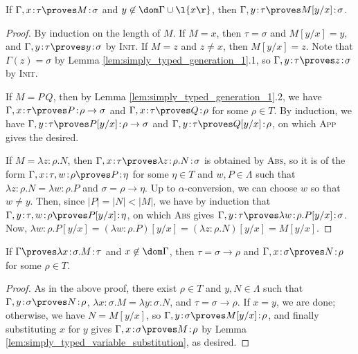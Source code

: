 \documentclass[reqno]{amsart}
\begin{document}
    \begin{lemma}\label{lem:simply_typed_variable_substitution}
        If $\Gamma,x\!:\!\tau\proves M\!:\!\sigma$ and $y\not\in\dom\Gamma\cup\l\{x\r\}$, then $\Gamma,y\!:\!\tau\proves M[y/x]\!:\!\sigma$.
    \end{lemma}
    \begin{proof}
        By induction on the length of $M$. If $M=x$, then $\tau=\sigma$ and $M[y/x]=y$, and $\Gamma,y\!:\!\tau\proves y\!:\!\sigma$ by \textsc{Init}. If $M=z$ and $z\neq x$, then $M[y/x]=z$. Note that $\Gamma(z)=\sigma$ by Lemma \ref{lem:simply_typed_generation_1}.1, so $\Gamma,y\!:\!\tau\proves z\!:\!\sigma$ by \textsc{Init}.

        If $M=P\,Q$, then by Lemma \ref{lem:simply_typed_generation_1}.2, we have $\Gamma,x\!:\!\tau\proves P\!:\!\rho\rightarrow\sigma$ and $\Gamma,x\!:\!\tau\proves Q\!:\!\rho$ for some $\rho\in T$. By induction, we have $\Gamma,y\!:\!\tau\proves P[y/x]\!:\!\rho\rightarrow\sigma$ and $\Gamma,y\!:\!\tau\proves Q[y/x]\!:\!\rho$, on which \textsc{App} gives the desired.

        If $M=\lambda z\!:\!\rho.N$, then $\Gamma,x\!:\!\tau\proves\lambda z\!:\!\rho.N\!:\!\sigma$ is obtained by \textsc{Abs}, so it is of the form $\Gamma,x\!:\!\tau,w\!:\!\rho\proves P\!:\!\eta$ for some $\eta\in T$ and $w,P\in\Lambda$ such that $\lambda z\!:\!\rho.N=\lambda w\!:\!\rho.P$ and $\sigma=\rho\to\eta$. Up to $\alpha$-conversion, we can choose $w$ so that $w\neq y$. Then, since $|P|=|N|<|M|$, we have by induction that $\Gamma,y\!:\!\tau,w\!:\!\rho\proves P[y/x]\!:\!\eta$, on which \textsc{Abs} gives $\Gamma,y\!:\!\tau\proves\lambda w\!:\!\rho.P[y/x]\!:\!\sigma$. Now, $\lambda w\!:\!\rho.P[y/x]=(\lambda w\!:\!\rho.P)[y/x]=(\lambda z\!:\!\rho.N)[y/x]=M[y/x]$.
    \end{proof}

    \begin{lemma}\label{lem:simply_typed_generation_2}
        If $\Gamma\proves\lambda x\!:\!\sigma.M\!:\!\tau$ and $x\not\in\dom\Gamma$, then $\tau=\sigma\rightarrow\rho$ and $\Gamma,x\!:\!\sigma\proves N\!:\!\rho$ for some $\rho\in T$.
    \end{lemma}
    \begin{proof}
        As in the above proof, there exist $\rho\in T$ and $y,N\in\Lambda$ such that $\Gamma,y\!:\!\sigma\proves N\!:\!\rho$, $\lambda x\!:\!\sigma.M=\lambda y\!:\!\sigma.N$, and $\tau=\sigma\rightarrow\rho$. If $x=y$, we are done; otherwise, we have $N=M[y/x]$, so $\Gamma,y\!:\!\sigma\proves M[y/x]\!:\!\rho$, and finally substituting $x$ for $y$ gives $\Gamma,x\!:\!\sigma\proves M\!:\!\rho$ by Lemma \ref{lem:simply_typed_variable_substitution}, as desired.
    \end{proof}
\end{document}
